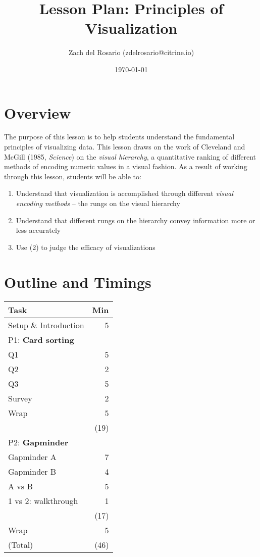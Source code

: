 \documentclass[11pt]{article}
\author{Zach del Rosario (zdelrosario@citrine.io)}
\date{\today}
\title{Lesson Plan: Principles of Visualization}
\begin{document}
\maketitle

\section{Overview}
\label{sec:org7719cc4}
The purpose of this lesson is to help students understand the fundamental
principles of visualizing data. This lesson draws on the work of Cleveland and
McGill (1985, \emph{Science}) on the \emph{visual hierarchy}, a quantitative ranking of
different methods of encoding numeric values in a visual fashion. As a result
of working through this lesson, students will be able to:

\begin{enumerate}
\item Understand that visualization is accomplished through different \emph{visual
encoding methods} -- the rungs on the visual hierarchy
\item Understand that different rungs on the hierarchy convey information more or
less accurately
\item Use (2) to judge the efficacy of visualizations
\end{enumerate}

\section{Outline and Timings}
\label{sec:org477b319}
\begin{center}
\begin{tabular}{lr}
Task & Min\\
\hline
Setup \& Introduction & 5\\
\hline
P1: \textbf{Card sorting} & \\
Q1 & 5\\
Q2 & 2\\
Q3 & 5\\
Survey & 2\\
Wrap & 5\\
 & (19)\\
\hline
P2: \textbf{Gapminder} & \\
Gapminder A & 7\\
Gapminder B & 4\\
A vs B & 5\\
1 vs 2: walkthrough & 1\\
 & (17)\\
\hline
Wrap & 5\\
(Total) & (46)\\
\end{tabular}
\end{center}
\end{document}
